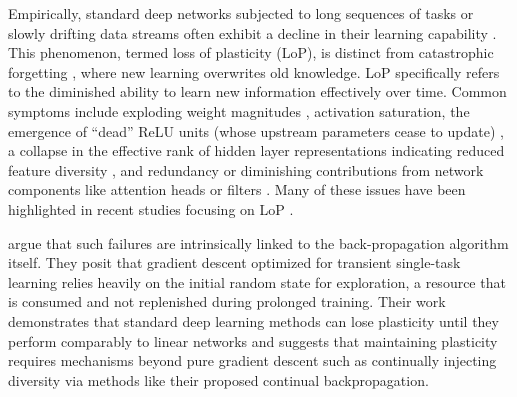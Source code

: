 \documentclass{article}
\numberwithin{figure}{section}
\begin{document}
Empirically, standard deep networks subjected to long sequences of tasks or slowly drifting data streams often exhibit a decline in their learning capability \citep{dohare2024loss, berariu2021plasticity, dohare2021continual, nikishin2022primacy, lyle2023understanding}. This phenomenon, termed loss of plasticity (LoP), is distinct from catastrophic forgetting \citep{mccloskey1989catastrophic, ratcliff1990connectionist, french1999catastrophic}, where new learning overwrites old knowledge. LoP specifically refers to the diminished ability to learn new information effectively over time. Common symptoms include exploding weight magnitudes \citep{nikishin2022primacy}, activation saturation, the emergence of ``dead'' ReLU units (whose upstream parameters cease to update) \citep{nair2010rectified, sokar2023dormant, dohare2021continual, lyle2022understanding}, a collapse in the effective rank of hidden layer representations indicating reduced feature diversity \citep{papyan2020prevalence, huh2022lowrank, kumar2020implicit, gulcehre2022empirical}, and redundancy or diminishing contributions from network components like attention heads or filters \citep{lyle2023understanding}. Many of these issues have been highlighted in recent studies focusing on LoP \citep{dohare2023maintaining, kumar2024regenerative, ash2020warmstarting}.

\citet{dohare2024loss} argue that such failures are intrinsically linked to the back-propagation algorithm itself. They posit that gradient descent optimized for transient single-task learning relies heavily on the initial random state for exploration, a resource that is consumed and not replenished during prolonged training. Their work demonstrates that standard deep learning methods can lose plasticity until they perform comparably to linear networks and suggests that maintaining plasticity requires mechanisms beyond pure gradient descent such as continually injecting diversity via methods like their proposed continual backpropagation.

\vspace{-7pt}
\end{document}
